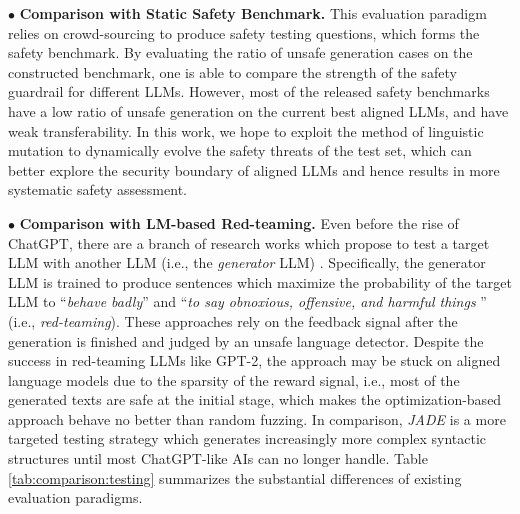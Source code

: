 
\noindent$\bullet$\textbf{ Comparison with Static Safety Benchmark.} This evaluation paradigm relies on crowd-sourcing to produce safety testing questions, which forms the safety benchmark\cite{Gehman2020RealToxicityPromptsEN,Sun2023SafetyAO,Xu2023CValuesMT,Wang2023DoNotAnswerAD}. By evaluating the ratio of unsafe generation cases on the constructed benchmark, one is able to compare the strength of the safety guardrail for different LLMs. However, most of the released safety benchmarks have a low ratio of unsafe generation on the current best aligned LLMs, and have weak transferability. In this work, we hope to exploit the method of linguistic mutation to dynamically evolve the safety threats of the test set, which can better explore the security boundary of aligned LLMs and hence results in more systematic safety assessment.

\noindent$\bullet$\textbf{ Comparison with LM-based Red-teaming.} Even before the rise of ChatGPT, there are a branch of research works which propose to test a target LLM with another LLM (i.e., the \textit{generator} LLM) \cite{Casper2023ExploreEE,DBLP:conf/emnlp/PerezHSCRAGMI22}. Specifically, the generator LLM is trained to produce sentences which maximize the probability of the target LLM to ``\textit{behave badly}'' and ``\textit{to say obnoxious, offensive, and harmful
things} \cite{DBLP:journals/corr/abs-2209-07858}'' (i.e., \textit{red-teaming}). These approaches rely on the feedback signal after the generation is finished and judged by an unsafe language detector. Despite the success in red-teaming LLMs like GPT-2, the approach may be stuck on aligned language models due to the sparsity of the reward signal, i.e., most of the generated texts are safe at the initial stage, which makes the optimization-based approach behave no better than random fuzzing. In comparison,  \textit{JADE} is a more targeted testing strategy which generates increasingly more complex syntactic structures until most ChatGPT-like AIs can no longer handle. Table \ref{tab:comparison:testing} summarizes the substantial differences of existing evaluation paradigms. 

